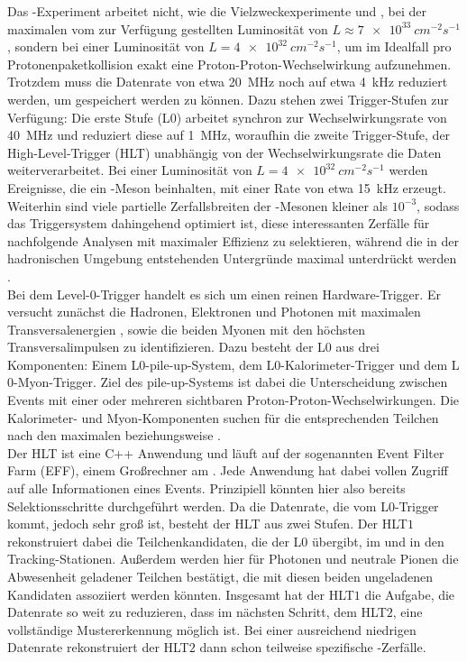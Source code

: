 Das \lhcb-Experiment arbeitet nicht, wie die Vielzweckexperimente \atlas und \cms, bei der maximalen vom \lhc zur Verfügung gestellten Luminosität von $L\approx\SI[exponent-product = \cdot]{7e33}{cm^{-2}s^{-1}}$, sondern bei einer Luminosität von $L=\SI[exponent-product = \cdot]{4e32}{cm^{-2}s^{-1}}$, um im Idealfall pro Protonenpaketkollision exakt eine Proton-Proton-Wechselwirkung aufzunehmen. Trotzdem muss die Datenrate von etwa \SI{20}{MHz} noch auf etwa \SI{4}{kHz} reduziert werden, um gespeichert werden zu können. Dazu stehen zwei Trigger-Stufen zur Verfügung: Die erste Stufe (L$0$) arbeitet synchron zur Wechselwirkungsrate von \SI{40}{MHz} und reduziert diese auf \SI{1}{MHz}, woraufhin die zweite Trigger-Stufe, der High-Level-Trigger (HLT) unabhängig von der Wechselwirkungsrate die Daten weiterverarbeitet. Bei einer Luminosität von $L=\SI[exponent-product = \cdot]{4e32}{cm^{-2}s^{-1}}$ werden Ereignisse, die ein \B-Meson beinhalten, mit einer Rate von etwa \SI{15}{kHz} erzeugt. Weiterhin sind viele partielle Zerfallsbreiten der \B-Mesonen kleiner als $10^{-3}$, sodass das  Triggersystem dahingehend optimiert ist, diese interessanten Zerfälle für nachfolgende Analysen mit maximaler Effizienz zu selektieren, während die in der hadronischen Umgebung entstehenden Untergründe maximal unterdrückt werden \cite{Alves:2008zz}.\\
Bei dem Level-0-Trigger handelt es sich um einen reinen Hardware-Trigger. Er versucht zunächst die Hadronen, Elektronen und Photonen mit maximalen Transversalenergien \et, sowie die beiden Myonen mit den höchsten Transversalimpulsen \pt zu identifizieren. Dazu besteht der L$0$ aus drei Komponenten: Einem L$0$-pile-up-System, dem L$0$-Kalorimeter-Trigger und dem L$0$-Myon-Trigger. Ziel des pile-up-Systems ist dabei die Unterscheidung zwischen Events mit einer oder mehreren sichtbaren Proton-Proton-Wechselwirkungen. Die Kalorimeter- und Myon-Komponenten suchen für die entsprechenden Teilchen nach den maximalen \et beziehungsweise \pt.\\
Der HLT ist eine C++ Anwendung und läuft auf der sogenannten Event Filter Farm (EFF), einem Großrechner am \cern. Jede Anwendung hat dabei vollen Zugriff auf alle Informationen eines Events. Prinzipiell könnten hier also bereits Selektionsschritte durchgeführt werden. Da die Datenrate, die vom L$0$-Trigger kommt, jedoch sehr groß ist, besteht der HLT aus zwei Stufen. Der HLT$1$ rekonstruiert dabei die Teilchenkandidaten, die der L$0$ übergibt, im \velo und in den Tracking-Stationen. Außerdem werden hier für Photonen und neutrale Pionen die Abwesenheit geladener Teilchen bestätigt, die mit diesen beiden ungeladenen Kandidaten assoziiert werden könnten. Insgesamt hat der HLT$1$ die Aufgabe, die Datenrate so weit zu reduzieren, dass im nächsten Schritt, dem HLT$2$, eine vollständige Mustererkennung möglich ist. Bei einer ausreichend niedrigen Datenrate rekonstruiert der HLT$2$ dann schon teilweise spezifische \B-Zerfälle.

